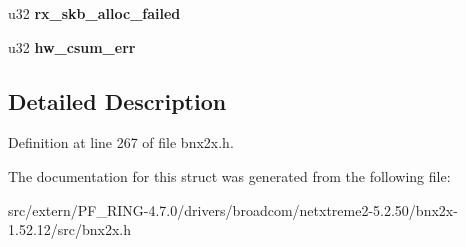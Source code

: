 \begin{DoxyCompactItemize}
\item 
\hypertarget{structbnx2x__eth__q__stats_a91302b01aeb7d497f7967cea8fd90cad}{
u32 {\bfseries rx\_\-skb\_\-alloc\_\-failed}}
\label{structbnx2x__eth__q__stats_a91302b01aeb7d497f7967cea8fd90cad}

\item 
\hypertarget{structbnx2x__eth__q__stats_af54dc71db01e2de2b6514ddaddc9d6b6}{
u32 {\bfseries hw\_\-csum\_\-err}}
\label{structbnx2x__eth__q__stats_af54dc71db01e2de2b6514ddaddc9d6b6}

\end{DoxyCompactItemize}


\subsection{Detailed Description}


Definition at line 267 of file bnx2x.h.



The documentation for this struct was generated from the following file:\begin{DoxyCompactItemize}
\item 
src/extern/PF\_\-RING-\/4.7.0/drivers/broadcom/netxtreme2-\/5.2.50/bnx2x-\/1.52.12/src/bnx2x.h\end{DoxyCompactItemize}
